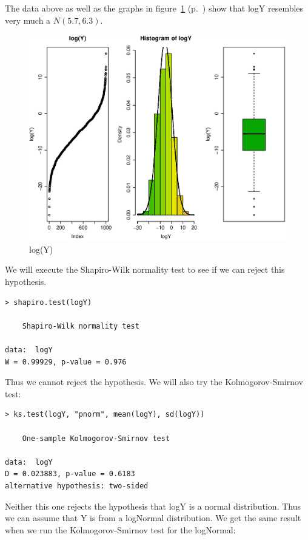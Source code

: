 \documentclass{article}
\begin{document}
\begin{enumerate}
  The data above as well as the graphs in figure~\ref{fig:logy}
  (p.~\pageref{fig:logy}) show that logY resembles very much a $N(5.7,6.3)$.
  
  \begin{figure}[H]
  \centering
  \includegraphics[scale=0.6]{logy.eps}
  \caption{log(Y)}
  \label{fig:logy}
  \end{figure}
  
  We will execute the Shapiro-Wilk normality test to see if we can reject this
  hypothesis.
  
  \begin{lstlisting}
> shapiro.test(logY)

	Shapiro-Wilk normality test

data:  logY
W = 0.99929, p-value = 0.976
  \end{lstlisting}

  Thus we cannot reject the hypothesis. We will also try the Kolmogorov-Smirnov
  test:
  
  \begin{lstlisting}
> ks.test(logY, "pnorm", mean(logY), sd(logY))

	One-sample Kolmogorov-Smirnov test

data:  logY
D = 0.023883, p-value = 0.6183
alternative hypothesis: two-sided
  \end{lstlisting}
  
  Neither this one rejects the hypothesis that logY is a normal distribution.
  Thus we can assume that Y is from a logNormal distribution. We get the same
  result when we run the Kolmogorov-Smirnov test for the logNormal:
  

\end{enumerate}
\end{document}
